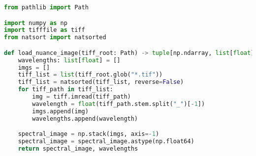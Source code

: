 \begin{lstlisting}[language=python, caption=Load Nuance Cmaera, label={code:load-nuance}]
from pathlib import Path

import numpy as np
import tifffile as tiff
from natsort import natsorted

def load_nuance_image(tiff_root: Path) -> tuple[np.ndarray, list[float]]:
    wavelengths: list[float] = []
    imgs = []
    tiff_list = list(tiff_root.glob("*.tif"))
    tiff_list = natsorted(tiff_list, reverse=False)
    for tiff_path in tiff_list:
        img = tiff.imread(tiff_path)
        wavelength = float(tiff_path.stem.split("_")[-1])
        imgs.append(img)
        wavelengths.append(wavelength)

    spectral_image = np.stack(imgs, axis=-1)
    spectral_image = spectral_image.astype(np.float64)
    return spectral_image, wavelengths

\end{lstlisting}